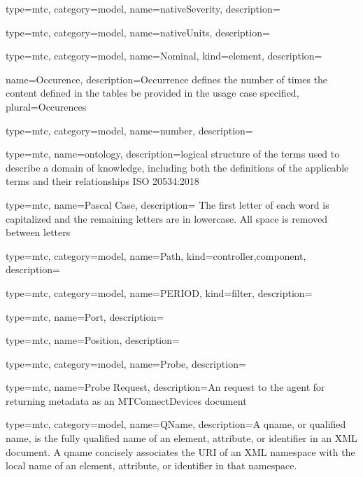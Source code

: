 {
  type=mtc,
  category=model,
  name={nativeSeverity},
  description={}
}


{
  type=mtc,
  category=model,
  name={nativeUnits},
  description={}
}



{
  type=mtc,
  category=model,
  name={Nominal},
  kind={element},
  description={}
}


{
  name={Occurence},
  description={Occurrence defines the number of times the content defined in the tables \MAY be provided in the usage case specified},
  plural={Occurences}
}


{
  type=mtc,
  category=model,
  name={number},
  description={}
}


{
  type=mtc,
  name=ontology,
  description={logical structure of the terms used to describe a domain of knowledge, including both the definitions of the applicable terms and their relationships ISO 20534:2018}
}


{
  type=mtc,
  name={Pascal Case},
  description= {The first letter of each word is capitalized and the remaining letters are in lowercase. All space is removed between letters}
}


{
  type=mtc,
  category=model,
  name={Path},
  kind={controller,component},
  description= {}
}


{
  type=mtc,
  category=model,
  name={PERIOD},
  kind={filter},
  description={}
}


{
  type=mtc,
  name={Port},
  description={}
}


{
  type=mtc,
  name={Position},
  description={}
}


{
  type=mtc,
  category=model,
  name={Probe},
  description={}
}


{
  type=mtc,
  name={Probe Request},
  description={An  request to the \gls{agent} for returning metadata as an MTConnectDevices  document}
}


{
  type=mtc,
  category=model,
  name={QName},
  description={A \gls{qname}, or qualified name, is the fully qualified name of an element, attribute, or identifier in an XML document. A  \gls{qname} concisely associates the URI of an XML namespace with the local name of an element, attribute, or identifier in that namespace.}
}



